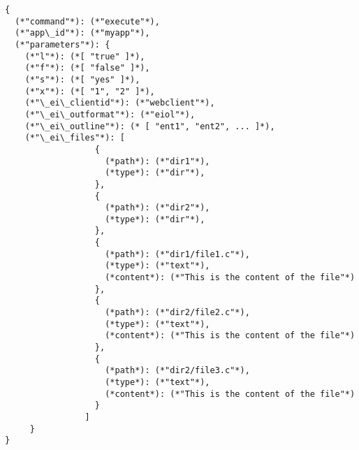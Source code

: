 \bigskip
\begin{lstlisting}
{
  (*"command"*): (*"execute"*),
  (*"app\_id"*): (*"myapp"*),
  (*"parameters"*): {
    (*"l"*): (*[ "true" ]*),
    (*"f"*): (*[ "false" ]*),
    (*"s"*): (*[ "yes" ]*),
    (*"x"*): (*[ "1", "2" ]*), 
    (*"\_ei\_clientid"*): (*"webclient"*),
    (*"\_ei\_outformat"*): (*"eiol"*),
    (*"\_ei\_outline"*): (* [ "ent1", "ent2", ... ]*),
    (*"\_ei\_files"*): [
                  {
                    (*path*): (*"dir1"*),
                    (*type*): (*"dir"*),
                  },
                  {
                    (*path*): (*"dir2"*),
                    (*type*): (*"dir"*),
                  },
                  {
                    (*path*): (*"dir1/file1.c"*),
                    (*type*): (*"text"*),
                    (*content*): (*"This is the content of the file"*)
                  },
                  {
                    (*path*): (*"dir2/file2.c"*),
                    (*type*): (*"text"*),
                    (*content*): (*"This is the content of the file"*)
                  },
                  {
                    (*path*): (*"dir2/file3.c"*),
                    (*type*): (*"text"*),
                    (*content*): (*"This is the content of the file"*)
                  }
                ]
     }
}
\end{lstlisting}

